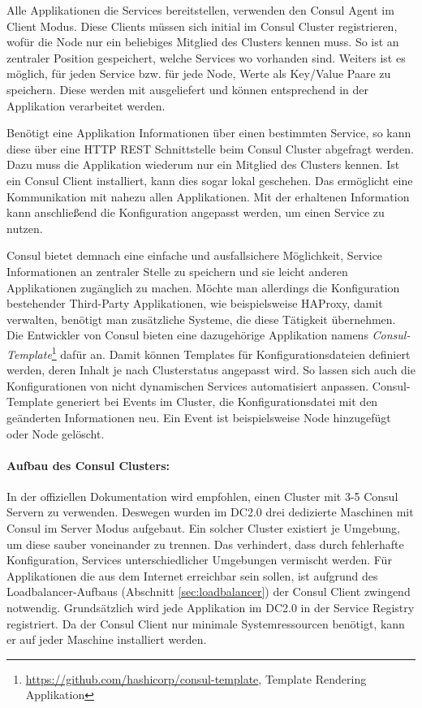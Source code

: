 Alle Applikationen die Services bereitstellen, verwenden den Consul Agent im Client Modus. Diese Clients müssen sich initial im Consul Cluster registrieren, wofür die Node nur ein beliebiges Mitglied des Clusters kennen muss. So ist an zentraler Position gespeichert, welche Services wo vorhanden sind. Weiters ist es möglich, für jeden Service bzw. für jede Node, Werte als Key/Value Paare zu speichern. Diese werden mit ausgeliefert und können entsprechend in der Applikation verarbeitet werden.

Benötigt eine Applikation Informationen über einen bestimmten Service, so kann diese über eine HTTP REST Schnittstelle beim Consul Cluster abgefragt werden. Dazu muss die Applikation wiederum nur ein Mitglied des Clusters kennen. Ist ein Consul Client installiert, kann dies sogar lokal geschehen. Das ermöglicht eine Kommunikation mit nahezu allen Applikationen. Mit der erhaltenen Information kann anschließend die Konfiguration angepasst werden, um einen Service zu nutzen.

Consul bietet demnach eine einfache und ausfallsichere Möglichkeit, Service Informationen an zentraler Stelle zu speichern und sie leicht anderen Applikationen zugänglich zu machen. Möchte man allerdings die Konfiguration bestehender Third-Party Applikationen, wie beispielsweise HAProxy, damit verwalten, benötigt man zusätzliche Systeme, die diese Tätigkeit übernehmen. Die Entwickler von Consul bieten eine dazugehörige Applikation namens \textit{Consul-Template}\footnote{\url{https://github.com/hashicorp/consul-template}, Template Rendering Applikation} dafür an. Damit können Templates für Konfigurationsdateien definiert werden, deren Inhalt je nach Clusterstatus angepasst wird. So lassen sich auch die Konfigurationen von nicht dynamischen Services automatisiert anpassen. Consul-Template generiert bei Events im Cluster, die Konfigurationsdatei mit den geänderten Informationen neu. Ein Event ist beispielsweise Node hinzugefügt oder Node gelöscht.   

\paragraph{Aufbau des Consul Clusters:}
In der offiziellen Dokumentation wird empfohlen, einen Cluster mit 3-5 Consul Servern zu verwenden. Deswegen wurden im DC2.0 drei dedizierte Maschinen mit Consul im Server Modus aufgebaut. Ein solcher Cluster existiert je Umgebung, um diese sauber voneinander zu trennen. Das verhindert, dass durch fehlerhafte Konfiguration, Services unterschiedlicher Umgebungen vermischt werden. Für Applikationen die aus dem Internet erreichbar sein sollen, ist aufgrund des Loadbalancer-Aufbaus (Abschnitt \ref{sec:loadbalancer}) der Consul Client zwingend notwendig. Grundsätzlich wird jede Applikation im DC2.0 in der Service Registry registriert. Da der Consul Client nur minimale Systemressourcen benötigt, kann er auf jeder Maschine installiert werden.

